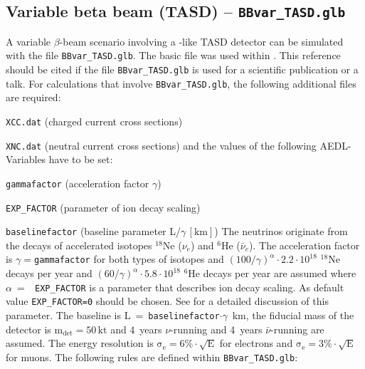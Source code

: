 \subsection*{Variable beta beam (TASD) -- {\tt BBvar\_TASD.glb}}

A variable $\beta$-beam scenario involving a \NOVA-like TASD detector can be simulated with the file 
{\tt BBvar\_TASD.glb}. The basic file was used within \cite{Huber:2005jk}. This reference
should be cited if the file {\tt BBvar\_TASD.glb} is used for a scientific publication or a talk. For calculations that
involve {\tt BBvar\_TASD.glb}, the following additional files are required:
\bi
\item {\tt XCC.dat} (charged current cross sections)
\item {\tt XNC.dat} (neutral current cross sections)
\ei
and the values of the following {\sf AEDL}-Variables have to be set:
\bi
\item {\tt gammafactor} (acceleration factor $\gamma$)
\item {\tt EXP\_FACTOR} (parameter of ion decay scaling)
\item {\tt baselinefactor} (baseline parameter L/$\gamma\,\left[\mathrm{km}\right]$)
\ei
The neutrinos originate from the decays of accelerated isotopes $^{18}$Ne ($\nu_e$) and $^6$He ($\bar{\nu}_e$).
The acceleration factor is $\gamma=${\tt gammafactor} for both types of isotopes and
$(100/\gamma)^\alpha\cdot2.2\cdot10^{18}$ $^{18}$Ne decays per
year and $(60/\gamma)^\alpha\cdot5.8\cdot10^{18}$ $^{6}$He decays per year are assumed where $\alpha$~=~{\tt
EXP\_FACTOR} is a parameter that describes ion decay scaling. As default value {\tt EXP\_FACTOR=0} should be chosen.
See \cite{Huber:2005jk} for a detailed discussion of this parameter. The baseline is L~=~{\tt baselinefactor}$\cdot\gamma$~km, the
fiducial mass of the detector is $\mathrm{m_{det} = 50 \,kt}$ and 4~years $\nu$-running and 4~years
$\bar{\nu}$-running are assumed. The energy resolution is $\mathrm{\sigma_e=6 \% \cdot \sqrt{E}}$ for electrons and  $\mathrm{\sigma_e=3 \% \cdot \sqrt{E}}$
for muons.  The following rules are defined within {\tt BBvar\_TASD.glb}:
